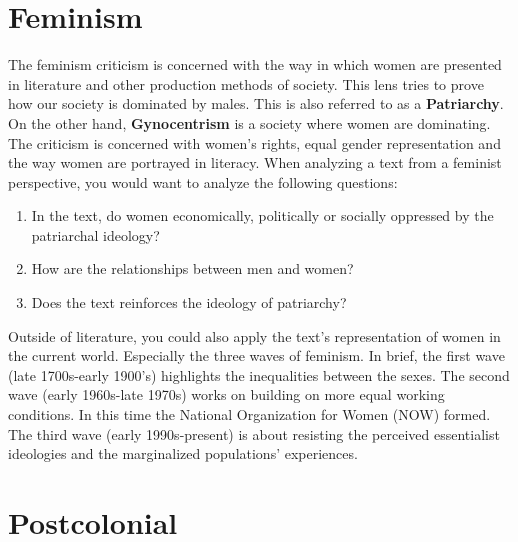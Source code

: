 \documentclass[11pt, twocolumn]{article}
\begin{document}
\begin{twocolumn}
\section{Feminism}
The feminism criticism is concerned with the way in which women are presented in literature and other production methods of society.
This lens tries to prove how our society is dominated by males. This is also referred to as a \textbf{Patriarchy}. On the other hand, \textbf{Gynocentrism} is a society where women are dominating.
The criticism is concerned with women’s rights, equal gender representation and the way women are portrayed in literacy.
When analyzing a text from a feminist perspective, you would want to analyze the following questions:
\begin{enumerate}
        \item In the text, do women economically, politically or socially oppressed by the patriarchal ideology?
        \item How are the relationships between men and women?
        \item Does the text reinforces the ideology of patriarchy?
\end{enumerate}
Outside of literature, you could also apply the text's representation of women in the current world. Especially the three waves of feminism.
In brief, the first wave (late 1700s-early 1900's) highlights the inequalities between the sexes.
The second wave (early 1960s-late 1970s) works on building on more equal working conditions. In this time the National Organization for Women (NOW) formed.
The third wave (early 1990s-present) is about resisting the perceived essentialist ideologies and the marginalized populations' experiences.

\section{Postcolonial}


\end{twocolumn}
\end{document}
